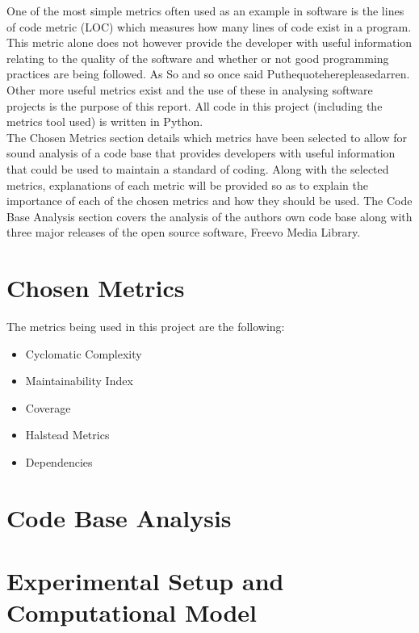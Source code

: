 \documentclass[11pt,journal, a4paper]{IEEEtran}
\begin{document}
\noindent
One of the most simple metrics often used as an example in software is the lines of code metric (LOC) which measures how many lines of code exist in a program. This metric alone does not however provide the developer with useful information relating to the quality of the software and whether or not good programming practices are being followed. As So and so once said Puthequoteherepleasedarren. Other more useful metrics exist and the use of these in analysing software projects is the purpose of this report. All code in this project (including the metrics tool used) is written in Python.  \\

\noindent
The Chosen Metrics section details which metrics have been selected to allow for sound analysis of a code base that provides developers with useful information that could be used to maintain a standard of coding. Along with the selected metrics, explanations of each metric will be provided so as to explain the importance of each of the chosen metrics and how they should be used. The Code Base Analysis section covers the analysis of the authors own code base along with three major releases of the open source software, Freevo Media Library. 



\section{Chosen Metrics}
\noindent
The metrics being used in this project are the following:
\begin{itemize}
\item Cyclomatic Complexity
\item Maintainability Index
\item Coverage
\item Halstead Metrics
\item Dependencies
\end{itemize}
\noindent

\section{Code Base Analysis}
\noindent

\section{Experimental Setup and Computational Model}
\noindent
\end{document}
